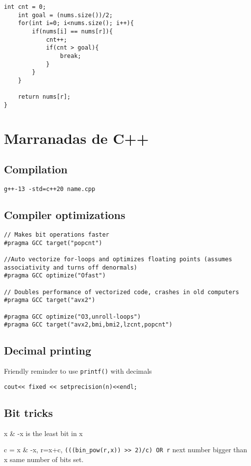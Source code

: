 \documentclass[10pt]{article}
\begin{document}
\begin{multicols*}{2}
\begin{lstlisting}[style=compactcpp]
    int cnt = 0;
    int goal = (nums.size())/2;
    for(int i=0; i<nums.size(); i++){
        if(nums[i] == nums[r]){
            cnt++;
            if(cnt > goal){
                break;
            }
        }
    }

    return nums[r];
}
\end{lstlisting}

\section{Marranadas de C++}

\subsection{Compilation}

\texttt{g++-13 -std=c++20 name.cpp}

\subsection{Compiler optimizations}


\begin{lstlisting}[style=compactcpp]
// Makes bit operations faster
#pragma GCC target("popcnt") 

//Auto vectorize for-loops and optimizes floating points (assumes associativity and turns off denormals)
#pragma GCC optimize("Ofast")

// Doubles performance of vectorized code, crashes in old computers
#pragma GCC target("avx2")

#pragma GCC optimize("O3,unroll-loops")
#pragma GCC target("avx2,bmi,bmi2,lzcnt,popcnt")
\end{lstlisting}

\subsection{Decimal printing}

Friendly reminder to use \texttt{printf()} with decimals

\begin{lstlisting}[style=compactcpp]
cout<< fixed << setprecision(n)<<endl;
\end{lstlisting}

\subsection{Bit tricks}

x \& -x is the least bit in x

c = x \& -x, r=x+c, \texttt{(((bin\_pow(r,x)) >> 2)/c) OR r}  next number bigger than x same number of bits set.

\end{multicols*}
\end{document}
